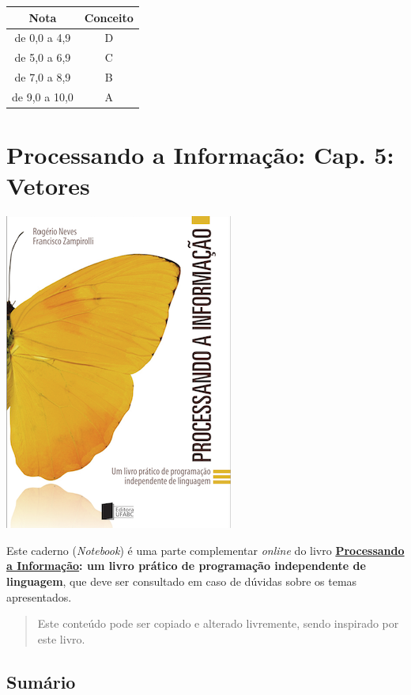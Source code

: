 \documentclass[12pt,a4paper]{article}
\begin{document}
\begin{longtable}[]{@{}cc@{}}
\toprule
Nota & Conceito\tabularnewline
\midrule
\endhead
de 0,0 a 4,9 & D\tabularnewline
de 5,0 a 6,9 & C\tabularnewline
de 7,0 a 8,9 & B\tabularnewline
de 9,0 a 10,0 & A\tabularnewline
\bottomrule
\end{longtable}

    \hypertarget{processando-a-informauxe7uxe3o-cap.-5-vetores}{%
\section{Processando a Informação: Cap. 5:
Vetores}\label{processando-a-informauxe7uxe3o-cap.-5-vetores}}

    \includegraphics{"figs/Capa_Processando_Informacao.jpg"}

Este caderno (\emph{Notebook}) é uma parte complementar \emph{online} do
livro
\textbf{\href{https://editora.ufabc.edu.br/matematica-e-ciencias-da-computacao/58-processando-a-informacao}{Processando
a Informação}: um livro prático de programação independente de
linguagem}, que deve ser consultado em caso de dúvidas sobre os temas
apresentados.

\begin{quote}
Este conteúdo pode ser copiado e alterado livremente, sendo inspirado
por este livro.
\end{quote}

    \hypertarget{sumuxe1rio}{%
\subsection{Sumário}\label{sumuxe1rio}}
\end{document}
